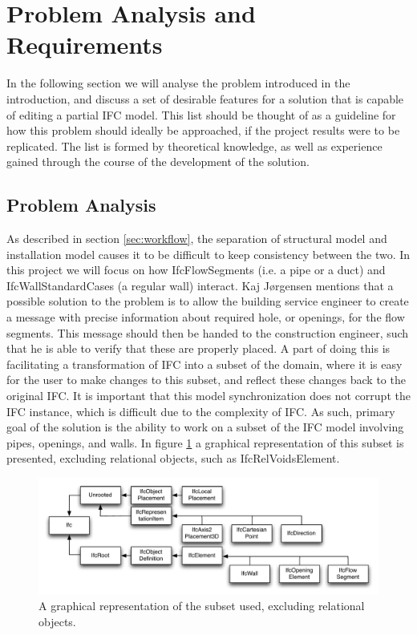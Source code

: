 \section{Problem Analysis and Requirements}
In the following section we will analyse the problem introduced in the introduction, and discuss a set of desirable features for a solution that is capable of editing a partial IFC model. This list should be thought of as a guideline for how this problem should ideally be approached, if the project results were to be replicated. The list is formed by theoretical knowledge, as well as experience gained through the course of the development of the solution.

\subsection{Problem Analysis}
\label{problem_analysis}
As described in section \ref{sec:workflow}, the separation of structural model and installation model causes it to be difficult to keep consistency between the two. In this project we will focus on how IfcFlowSegments (i.e. a pipe or a duct) and IfcWallStandardCases (a regular wall) interact. Kaj Jørgensen mentions that a possible solution to the problem is to allow the building service engineer to create a message with precise information about required hole, or openings, for the flow segments. This message should then be handed to the construction engineer, such that he is able to verify that these are properly placed. A part of doing this is facilitating a transformation of IFC into a subset of the domain, where it is easy for the user to make changes to this subset, and reflect these changes back to the original IFC. It is important that this model synchronization does not corrupt the IFC instance, which is difficult due to the complexity of IFC. As such, primary goal of the solution is the ability to work on a subset of the IFC model involving pipes, openings, and walls. In figure \ref{fig:ifcheirachy} a graphical representation of this subset is presented, excluding relational objects, such as IfcRelVoidsElement.

\begin{figure}[htbp]
    \centering
        \includegraphics[width=120mm]{images/IfcHeirachy.pdf}
    \caption{A graphical representation of the subset used, excluding relational objects.}
    \label{fig:ifcheirachy}
\end{figure}

